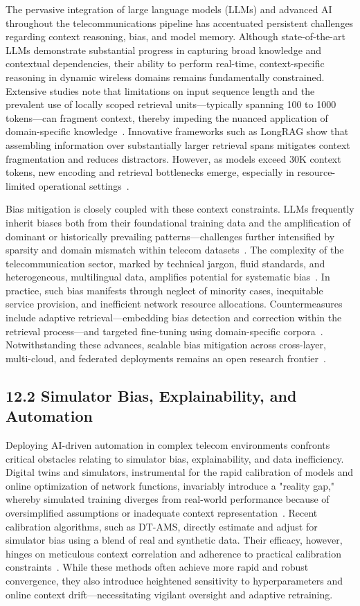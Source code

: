 \documentclass[11pt]{article}
\begin{document}
The pervasive integration of large language models (LLMs) and advanced AI throughout the telecommunications pipeline has accentuated persistent challenges regarding context reasoning, bias, and model memory. Although state-of-the-art LLMs demonstrate substantial progress in capturing broad knowledge and contextual dependencies, their ability to perform real-time, context-specific reasoning in dynamic wireless domains remains fundamentally constrained. Extensive studies note that limitations on input sequence length and the prevalent use of locally scoped retrieval units—typically spanning 100 to 1000 tokens—can fragment context, thereby impeding the nuanced application of domain-specific knowledge~\cite{7,9,16,20,21,22,28,37}. Innovative frameworks such as LongRAG show that assembling information over substantially larger retrieval spans mitigates context fragmentation and reduces distractors. However, as models exceed 30K context tokens, new encoding and retrieval bottlenecks emerge, especially in resource-limited operational settings~\cite{37}.

Bias mitigation is closely coupled with these context constraints. LLMs frequently inherit biases both from their foundational training data and the amplification of dominant or historically prevailing patterns—challenges further intensified by sparsity and domain mismatch within telecom datasets~\cite{7,9,21}. The complexity of the telecommunication sector, marked by technical jargon, fluid standards, and heterogeneous, multilingual data, amplifies potential for systematic bias~\cite{7,22,26}. In practice, such bias manifests through neglect of minority cases, inequitable service provision, and inefficient network resource allocations. Countermeasures include adaptive retrieval—embedding bias detection and correction within the retrieval process—and targeted fine-tuning using domain-specific corpora~\cite{20,28}. Notwithstanding these advances, scalable bias mitigation across cross-layer, multi-cloud, and federated deployments remains an open research frontier~\cite{16,26,37}.

\subsection{12.2 Simulator Bias, Explainability, and Automation}

Deploying AI-driven automation in complex telecom environments confronts critical obstacles relating to simulator bias, explainability, and data inefficiency. Digital twins and simulators, instrumental for the rapid calibration of models and online optimization of network functions, invariably introduce a "reality gap," whereby simulated training diverges from real-world performance because of oversimplified assumptions or inadequate context representation~\cite{37,41}. Recent calibration algorithms, such as DT-AMS, directly estimate and adjust for simulator bias using a blend of real and synthetic data. Their efficacy, however, hinges on meticulous context correlation and adherence to practical calibration constraints~\cite{41}. While these methods often achieve more rapid and robust convergence, they also introduce heightened sensitivity to hyperparameters and online context drift—necessitating vigilant oversight and adaptive retraining.
\end{document}
